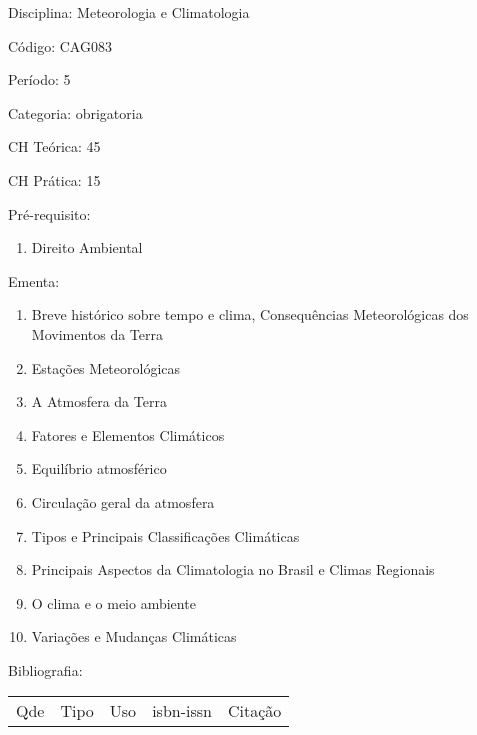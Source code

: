 \documentclass[12pt,a4paper,twoside]{report}
\begin{document}
Disciplina: Meteorologia e Climatologia

Código: CAG083

Período: 5

Categoria: obrigatoria

CH Teórica: 45

CH Prática: 15




Pré-requisito:
\begin{enumerate}
\item Direito Ambiental
\end{enumerate}

Ementa:
\begin{enumerate}
\item Breve histórico sobre tempo e clima, Consequências Meteorológicas dos Movimentos da Terra
\item Estações Meteorológicas
\item A Atmosfera da Terra
\item Fatores e Elementos Climáticos
\item Equilíbrio atmosférico
\item Circulação geral da atmosfera
\item Tipos e Principais Classificações Climáticas
\item Principais Aspectos da Climatologia no Brasil e Climas Regionais
\item O clima e o meio ambiente
\item Variações e Mudanças Climáticas
\end{enumerate}



Bibliografia:


\begin{tabular}{llllp{8cm}}
Qde & Tipo & Uso & isbn-issn & Citação \\
\end{tabular}
\end{document}
